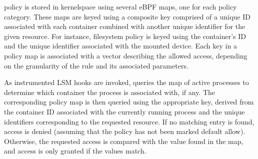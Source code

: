 \bpfcontain{} policy is stored in kernelspace using several eBPF maps, one for
each policy category. These maps are keyed using a composite key comprised of
a unique ID associated with each container combined with another unique
identifier for the given resource. For instance, filesystem policy is
keyed using the container's ID and the unique identifier associated with the
mounted device. Each key in a policy map is associated with a vector describing
the allowed access, depending on the granularity of the rule and its associated
parameters.

As instrumented LSM hooks are invoked, \bpfcontain{} queries the map of active
processes to determine which container the process is associated with, if any.
The corresponding policy map is then queried using the appropriate key, derived
from the container ID associated with the currently running process and the
unique identifiers corresponding to the requested resource. If no matching entry
is found, access is denied (assuming that the policy has not been marked default
allow).  Otherwise, the requested access is compared with the value found in the
map, and access is only granted if the values match.

